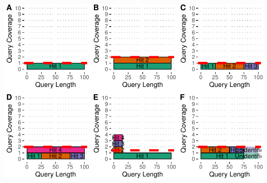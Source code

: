 \documentclass[]{elsarticle} %
\let\origfigure\figure
\let\endorigfigure\endfigure
\renewenvironment{figure}[1][2] {
    \expandafter\origfigure\expandafter[H]
} {
    \endorigfigure
}
\begin{document}
\begin{figure}[H]
\includegraphics[width=6in,]{paper_PLOS_draft_files/figure-latex/Figure-ECNC-1} \caption{Estimated Copy Number by Coverage (ECNC) consolidates fragmented genes while accounting for missing domains in homologs. \textbf{A)} A single, contiguous gene homolog in a target genome with 100\% query length coverage has an ECNC of 1.0. \textbf{B)} Two contiguous gene homologs, each with 100\% query length coverage have an ECNC of 2.0. \textbf{C)} A single gene homolog, split across multiple scaffolds and contigs in a fragmented target genome; BLAT identifies each fragment as a single hit. Per nucleotide of query sequence, there is only one corresponding nucleotide over all the hits, thus the ECNC is 1.0. \textbf{D)} Two gene homologs, one fragmented and one contiguous. 100\% of nucleotides in the query sequence are represented between all hits; however, every nucleotide in the query has two matching nucleotides in the target genome, thus the ECNC is 2.0. \textbf{E)} One true gene homolog in the target genome, plus multiple hits of a conserved domain that span 20\% of the query sequence. While 100\% of the query sequence is represented in total, 20\% of the nucleotides have 4 hits. Thus, the ECNC for this gene is 1.45. \textbf{F)} Two real gene homologs; one hit is contiguous, one hit is fragmented in two, and the tail end of both sequences was not identified by BLAT due to sequence divergence. Only 75\% of the query sequence was covered in total between the hits, but for that 75\%, each nucleotide has two hits. As such, ECNC is equal to 2.0 for this gene.}\label{fig:Figure-ECNC}
\end{figure}
\end{document}
